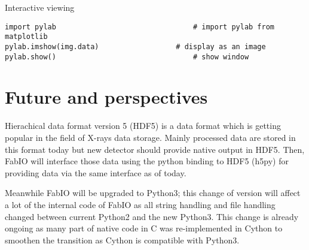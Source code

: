 \documentclass{iucr}
\begin{document}
Interactive viewing

\begin{verbatim}
import pylab								# import pylab from matplotlib
pylab.imshow(img.data)					# display as an image
pylab.show()								# show window
\end{verbatim}





\section{Future and perspectives}

Hierachical data format version 5 (HDF5\cite{hdf5}) is a data format which is
getting popular in the field of X-rays data storage. Mainly processed
data are stored in this format today but new detector should provide native
output in HDF5. Then, FabIO will interface those data using the python binding 
to HDF5 (h5py\cite{h5py}) for providing data via the same interface as of today.

Meanwhile FabIO will be upgraded to Python3; this change of version will affect
a lot of the internal code of FabIO as all string handling and file handling
changed between current Python2 and the new Python3. This change is already
ongoing as many part of native code in C was re-implemented in
Cython\cite{cython} to smoothen the transition as Cython is compatible with
Python3.
\end{document}
